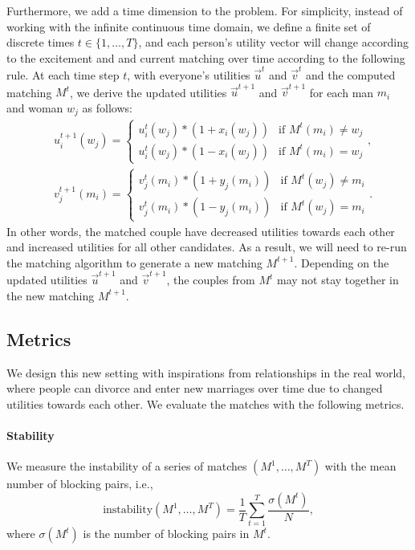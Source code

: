 Furthermore, we add a time dimension to the problem. For simplicity, instead of working with the infinite continuous time domain, we define a finite set of discrete times $t \in \{1, \ldots, T\}$, and each person's utility vector will change according to the excitement and and current matching over time according to the following rule. At each time step $t$, with everyone's utilities $\overrightarrow{u}^{t}$ and $\overrightarrow{v}^{t}$ and the computed matching $M^t$, we derive the updated utilities $\overrightarrow{u}^{t+1}$ and $\overrightarrow{v}^{t+1}$ for each man $m_i$ and woman $w_j$ as follows:
    \begin{align*}
        & u^{t+1}_i(w_j) = \begin{cases} u^t_i(w_j) * (1 + x_i(w_j)) &\text{if $M^t(m_i) \neq w_j$} \\ u^t_i(w_j) * (1 - x_i(w_j)) &\text{if $M^t(m_i) = w_j$} \end{cases},\\
        & v^{t+1}_j(m_i) = \begin{cases} v^t_j(m_i) * (1 + y_j(m_i)) &\text{if $M^t(w_j) \neq m_i$} \\ v^t_j(m_i) * (1 - y_j(m_i)) &\text{if $M^t(w_j) = m_i$} \end{cases}.
    \end{align*}
In other words, the matched couple have decreased utilities towards each other and increased utilities for all other candidates. As a result, we will need to re-run the matching algorithm to generate a new matching $M^{t+1}$. Depending on the updated utilities $\overrightarrow{u}^{t+1}$ and $\overrightarrow{v}^{t+1}$, the couples from $M^t$ may not stay together in the new matching $M^{t+1}$.


\subsection{Metrics}
We design this new setting with inspirations from relationships in the real world, where people can divorce and enter new marriages over time due to changed utilities towards each other. We evaluate the matches with the following metrics.
\paragraph{Stability} We measure the instability of a series of matches $(M^1, \ldots, M^T)$ with the mean number of blocking pairs, i.e.,
\begin{equation}
    \mbox{instability}(M^1, \ldots, M^T) = \frac{1}{T}\sum_{t=1}^T{\frac{\sigma(M^t)}{N}},
\end{equation}
where $\sigma(M^t)$ is the number of blocking pairs in $M^t$.
